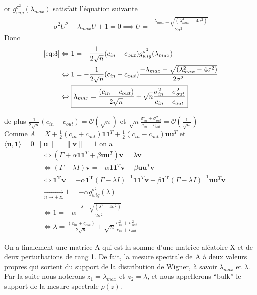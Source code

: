 or $g_{wig}^{\sigma^2}(\lambda_{max})$ satisfait l'équation suivante 
\begin{align}
	\sigma^2U^2+\lambda_{max}U+1=0 \implies U = \frac{- \lambda_{max} \pm \sqrt{(\lambda_{max}^2 - 4\sigma^2)}}{2\sigma^2}
\end{align}
Donc
\begin{align}
	\eqref{eq:3} &\Leftrightarrow1 = -\frac{1}{2\sqrt{n}}(c_{in} - c_{out}) g_{wig}^{\sigma^2}(\lambda_{max}) \nonumber\\
	&\Leftrightarrow 1 = -\frac{1}{2\sqrt{n}}(c_{in} - c_{out}) \frac{- \lambda_{max} - \sqrt{(\lambda_{max}^2 - 4\sigma^2)}}{2\sigma^2} \nonumber\\
	&\Leftrightarrow \boxed{\lambda_{max}=\frac{(c_{in} - c_{out})}{2\sqrt{n}} + \sqrt{n}\frac{\sigma_{in}^2 + \sigma_{out}^2}{c_{in} - c_{out}}} \label{z_1}
\end{align}

de plus $\frac{1}{2\sqrt{n}}(c_{in} - c_{out}) = \mathcal{O}(\sqrt{n})$ et $\sqrt{n}\frac{\sigma_{in}^2 + \sigma_{out}^2}{c_{in} - c_{out}} =  \mathcal{O}\left(\frac{1}{\sqrt{n}}\right)$\\
 
Comme $A = X + \frac{1}{2}(c_{in} + c_{out})\mathbf{11}^T + \frac{1}{2}(c_{in} - c_{out})\mathbf{uu}^T$ et $\langle\mathbf{u}, \mathbf{1}\rangle = 0 \; \|\mathbf{u}\|=\|\mathbf{v}\|=1$ on a
\begin{align}
	&\Leftrightarrow (\Gamma + \alpha\mathbf{11}^T + \beta \mathbf{uu}^T)\mathbf{v} = \lambda \mathbf{v}\nonumber\\
	&\Leftrightarrow (\Gamma - \lambda I)\mathbf{v} = -\alpha\mathbf{11}^T\mathbf{v} - \beta \mathbf{uu}^T\mathbf{v} \nonumber\\
	&\Leftrightarrow \mathbf{1^Tv} = -\alpha\mathbf{1^T} (\Gamma - \lambda I)^{-1}\mathbf{11}^T\mathbf{v} - \beta \mathbf{1^T} (\Gamma - \lambda I)^{-1}\mathbf{uu}^T\mathbf{v} \nonumber\\
	&\xrightarrow[n \to +\infty]{} 1 = -\alpha g_{wig}^{\sigma^2}(\lambda) \nonumber\\
	&\Leftrightarrow 1 = -\alpha  \frac{- \lambda - \sqrt{(\lambda^2 - 4\sigma^2)}}{2\sigma^2}\nonumber\\
	&\Leftrightarrow \boxed{\lambda = \frac{(c_{in} + c_{out})}{2\sqrt{n}} + \sqrt{n}\frac{\sigma_{in}^2 + \sigma_{out}^2}{c_{in} + c_{out}}} \label{z_2}
\end{align} 

On a finalement une matrice A qui est la somme d'une matrice aléatoire X et de deux perturbations de rang 1.
De fait, la mesure spectrale de A à deux valeurs propres qui sortent du support de la distribution de Wigner, à savoir $\lambda_{max}$ et $\lambda$.
Par la suite nous noterons $z_1 = \lambda_{max}$ et $z_2 = \lambda$, et nous appellerons ``bulk'' le support de la mesure spectrale $\rho(z)$.

